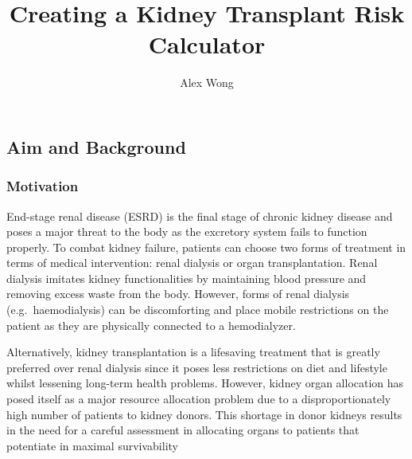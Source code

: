 \documentclass[a4paper,9pt,twocolumn,twoside,]{pinp}
\title{Creating a Kidney Transplant Risk Calculator}
\author[]{Alex Wong}
\affil[]{GitHub code repository is
\href{https://github.com/alexwong23/DATA3888-Project-Report.git}{here}}
\begin{document}
\verticaladjustment{-2pt}

\maketitle
\thispagestyle{firststyle}



\hypertarget{aim-and-background}{%
\subsection{Aim and Background}\label{aim-and-background}}

\hypertarget{motivation}{%
\subsubsection{Motivation}\label{motivation}}

End-stage renal disease (ESRD) is the final stage of chronic kidney
disease and poses a major threat to the body as the excretory system
fails to function properly. To combat kidney failure, patients can
choose two forms of treatment in terms of medical intervention: renal
dialysis or organ transplantation. Renal dialysis imitates kidney
functionalities by maintaining blood pressure and removing excess waste
from the body. However, forms of renal dialysis (e.g.~haemodialysis) can
be discomforting and place mobile restrictions on the patient as they
are physically connected to a hemodialyzer.

Alternatively, kidney transplantation is a lifesaving treatment that is
greatly preferred over renal dialysis since it poses less restrictions
on diet and lifestyle whilst lessening long-term health problems.
However, kidney organ allocation has posed itself as a major resource
allocation problem due to a disproportionately high number of patients
to kidney donors. This shortage in donor kidneys results in the need for
a careful assessment in allocating organs to patients that potentiate in
maximal survivability
\end{document}
